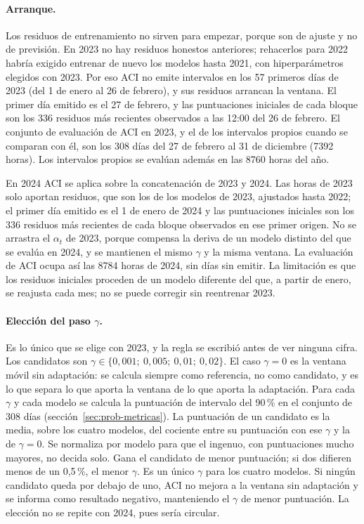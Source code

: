 \paragraph{Arranque.} Los residuos de entrenamiento no sirven para empezar,
porque son de ajuste y no de previsión. En 2023 no hay residuos honestos
anteriores; rehacerlos para 2022 habría exigido entrenar de nuevo los modelos
hasta 2021, con hiperparámetros elegidos con 2023. Por eso ACI no emite
intervalos en los 57 primeros días de 2023 (del 1 de enero al 26 de febrero), y
sus residuos arrancan la ventana. El primer día emitido es el 27 de febrero, y
las puntuaciones iniciales de cada bloque son los 336 residuos más recientes
observados a las 12:00 del 26 de febrero. El conjunto de evaluación de ACI en
2023, y el de los intervalos propios cuando se comparan con él, son los 308
días del 27 de febrero al 31 de diciembre (7392 horas). Los intervalos propios
se evalúan además en las 8760 horas del año.

En 2024 ACI se aplica sobre la concatenación de 2023 y 2024. Las horas de 2023
solo aportan residuos, que son los de los modelos de 2023, ajustados hasta
2022; el primer día emitido es el 1 de enero de 2024 y las puntuaciones
iniciales son los 336 residuos más recientes de cada bloque observados en ese
primer origen. No se arrastra el $\alpha_t$ de 2023, porque compensa la deriva
de un modelo distinto del que se evalúa en 2024, y se mantienen el mismo
$\gamma$ y la misma ventana. La evaluación de ACI ocupa así las 8784 horas de
2024, sin días sin emitir. La limitación es que los residuos iniciales
proceden de un modelo diferente del que, a partir de enero, se reajusta cada
mes; no se puede corregir sin reentrenar 2023.

\paragraph{Elección del paso $\gamma$.} Es lo único que se elige con 2023, y
la regla se escribió antes de ver ninguna cifra. Los candidatos son $\gamma \in
\{0{,}001;\ 0{,}005;\ 0{,}01;\ 0{,}02\}$. El caso $\gamma = 0$ es la ventana
móvil sin adaptación: se calcula siempre como referencia, no como candidato, y
es lo que separa lo que aporta la ventana de lo que aporta la adaptación. Para
cada $\gamma$ y cada modelo se calcula la puntuación de intervalo del 90\,\%
en el conjunto de 308 días (sección~\ref{sec:prob-metricas}). La puntuación de
un candidato es la media, sobre los cuatro modelos, del cociente entre su
puntuación con ese $\gamma$ y la de $\gamma = 0$. Se normaliza por modelo para
que el ingenuo, con puntuaciones mucho mayores, no decida solo. Gana el
candidato de menor puntuación; si dos difieren menos de un 0,5\,\%, el menor
$\gamma$. Es un único $\gamma$ para los cuatro modelos. Si ningún candidato
queda por debajo de uno, ACI no mejora a la ventana sin adaptación y se
informa como resultado negativo, manteniendo el $\gamma$ de menor puntuación.
La elección no se repite con 2024, pues sería circular.

